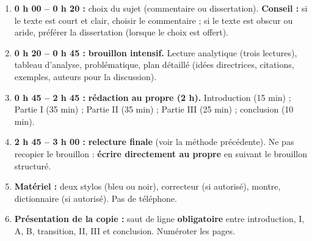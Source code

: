 \documentclass[11pt]{article}
\begin{document}
\begin{methode}
\begin{enumerate}
    \item \textbf{0 h 00 -- 0 h 20 :} choix du sujet (commentaire ou dissertation). \textbf{Conseil :} si le texte est court et clair, choisir le commentaire ; si le texte est obscur ou aride, préférer la dissertation (lorsque le choix est offert).
    \item \textbf{0 h 20 -- 0 h 45 :} \textbf{brouillon intensif.} Lecture analytique (trois lectures), tableau d'analyse, problématique, plan détaillé (idées directrices, citations, exemples, auteurs pour la discussion).
    \item \textbf{0 h 45 -- 2 h 45 :} \textbf{rédaction au propre (2 h).} Introduction (15 min) ; Partie I (35 min) ; Partie II (35 min) ; Partie III (25 min) ; conclusion (10 min).
    \item \textbf{2 h 45 -- 3 h 00 :} \textbf{relecture finale} (voir la méthode précédente). Ne pas recopier le brouillon : \textbf{écrire directement au propre} en suivant le brouillon structuré.
    \item \textbf{Matériel :} deux stylos (bleu ou noir), correcteur (si autorisé), montre, dictionnaire (si autorisé). Pas de téléphone.
    \item \textbf{Présentation de la copie :} saut de ligne \textbf{obligatoire} entre introduction, I, A, B, transition, II, III et conclusion. Numéroter les pages.
\end{enumerate}
\end{methode}
\end{document}
